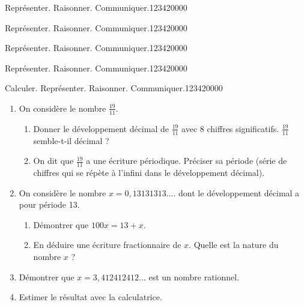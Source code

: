 \begin{pageAD}
\begin{ExoCad}{Représenter. Raisonner. Communiquer.}{1234}{2}{0}{0}{0}{0}

\end{ExoCad}

\begin{ExoCad}{Représenter. Raisonner. Communiquer.}{1234}{2}{0}{0}{0}{0}
 


 \end{ExoCad}
 
\begin{ExoCad}{Représenter. Raisonner. Communiquer.}{1234}{2}{0}{0}{0}{0}


\end{ExoCad}

\begin{ExoCad}{Représenter. Raisonner. Communiquer.}{1234}{2}{0}{0}{0}{0}


 \end{ExoCad}

\begin{ExoCad}{Calculer. Représenter. Raisonner. Communiquer.}{1234}{2}{0}{0}{0}{0}

 

\begin{enumerate}
\item On considère le nombre $\frac{19}{11}$.

\begin{enumerate}
\item Donner le développement décimal de $\frac{19}{11}$ avec 8 chiffres significatifs. $\frac{19}{11}$ semble-t-il décimal ?
\item On dit que $\frac{19}{11}$ a une écriture périodique.
Préciser sa période (série de chiffres qui se répète à l'infini dans le développement décimal).
\end{enumerate}
\item On considère le nombre $x=0,13131313....$ dont le développement décimal a pour période 13.
\begin{enumerate}
\item Démontrer que $100x = 13 + x$. 
\item  En déduire une écriture fractionnaire de $x$. Quelle est la nature du nombre $x$ ?
\end{enumerate}
\item Démontrer que $x=3,412412412...$ est un nombre rationnel. 
\item Estimer le résultat avec la calculatrice.
\end{enumerate}
\end{ExoCad}






\end{pageAD}
